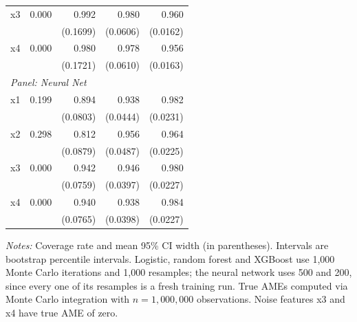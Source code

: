 \begin{table}[htbp]
\begin{threeparttable}
\begin{tabular}{lrrrr}
\quad x3 & 0.000 & 0.992 & 0.980 & 0.960 \\
 &  & (0.1699) & (0.0606) & (0.0162) \\
\quad x4 & 0.000 & 0.980 & 0.978 & 0.956 \\
 &  & (0.1721) & (0.0610) & (0.0163) \\
\midrule
\multicolumn{5}{l}{\textit{Panel: Neural Net}} \\
\quad x1 & 0.199 & 0.894 & 0.938 & 0.982 \\
 &  & (0.0803) & (0.0444) & (0.0231) \\
\quad x2 & 0.298 & 0.812 & 0.956 & 0.964 \\
 &  & (0.0879) & (0.0487) & (0.0225) \\
\quad x3 & 0.000 & 0.942 & 0.946 & 0.980 \\
 &  & (0.0759) & (0.0397) & (0.0227) \\
\quad x4 & 0.000 & 0.940 & 0.938 & 0.984 \\
 &  & (0.0765) & (0.0398) & (0.0227) \\
\bottomrule
\end{tabular}
\begin{tablenotes}
\footnotesize
\item \textit{Notes:} Coverage rate and mean 95\% CI width (in parentheses). Intervals are bootstrap percentile intervals. Logistic, random forest and XGBoost use 1{,}000 Monte Carlo iterations and 1{,}000 resamples; the neural network uses 500 and 200, since every one of its resamples is a fresh training run. True AMEs computed via Monte Carlo integration with $n=1{,}000{,}000$ observations. Noise features x3 and x4 have true AME of zero.
\end{tablenotes}
\end{threeparttable}
\end{table}